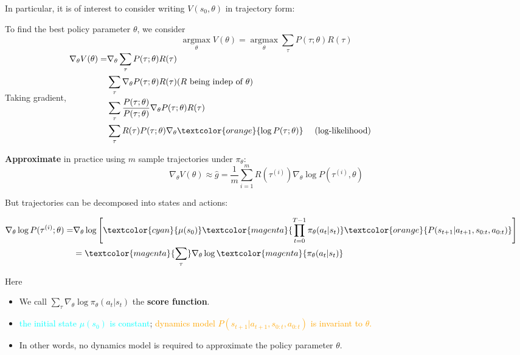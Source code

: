 \documentclass{article}
\begin{document}
In particular, it is of interest to consider writing $V(s_0, \theta)$ in trajectory form:
\begin{prfbox}
    To find the best policy parameter $\theta$, we consider
    \begin{equation*}
        \mathop{\arg\max}\limits_{\theta} V(\theta)
        =
        \mathop{\arg\max}\limits_{\theta} \sum_{\tau} P(\tau ; \theta) R(\tau)
    \end{equation*}
    Taking gradient,
    $\begin{aligned}
        \nabla_{\theta} V(\theta) =
        & \nabla_{\theta} \sum_{\tau} P(\tau; \theta) R(\tau) \\
        & \sum_{\tau} \nabla_{\theta} P(\tau; \theta) R(\tau) \text{($R$ being indep of $\theta$)}\\
        & \sum_{\tau} \frac{P(\tau; \theta)}{P(\tau; \theta)} \nabla_{\theta} P(\tau; \theta) R(\tau) \\
        & \sum_{\tau} R(\tau) P(\tau; \theta) \nabla_{\theta} \textcolor{orange}{\log P(\tau; \theta)} ~~~~\text{(log-likelihood)} \\
    \end{aligned}$

    \textbf{Approximate} in practice using $m$ sample trajectories under $\pi_{\theta}$:
    \begin{equation*}
        \nabla_{\theta} V(\theta) \approx \hat{g} = \frac{1}{m} \sum_{i = 1}^{m} R(\tau^{(i)}) \nabla_{\theta} \log P(\tau^{(i)}, \theta)
    \end{equation*}
\end{prfbox}

But trajectories can be decomposed into states and actions:
\begin{prfbox}
    $\begin{aligned}
        \nabla_{\theta} \log P(\tau^{(i)}; \theta) =
        & \nabla_{\theta} \log \left[ \textcolor{cyan}{\mu(s_0)} 
            \textcolor{magenta}{\prod_{t = 0}^{T-1} \pi_{\theta} (a_t | s_t)}
            \textcolor{orange}{P(s_{t+1} | a_{t+1}, s_{0:t}, a_{0:t})} \right] \\
        & =\textcolor{magenta}{\sum_{\tau}} \nabla_{\theta} \log \textcolor{magenta}{\pi_{\theta} (a_t | s_t)} \\
    \end{aligned}$
\end{prfbox}

Here 
    \begin{itemize}
    \item We call $\sum_{\tau} \nabla_{\theta} \log \pi_{\theta} (a_t | s_t)$ the \textbf{score function}.
    \item \textcolor{cyan}{the initial state $\mu(s_0)$ is constant};  
        \textcolor{orange}{dynamics model $P(s_{t+1} | a_{t+1}, s_{0:t}, a_{0:t})$ is invariant to $\theta$.}
    \item In other words, no dynamics model is required to approximate the policy parameter $\theta$.
    \end{itemize}
\end{document}
